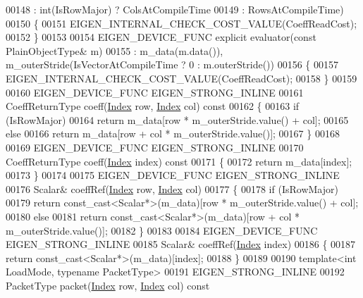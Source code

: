 \begin{DoxyCode}
00148                                            : int(IsRowMajor) ? ColsAtCompileTime 
00149                                            : RowsAtCompileTime)
00150   \{
00151     EIGEN\_INTERNAL\_CHECK\_COST\_VALUE(CoeffReadCost);
00152   \}
00153   
00154   EIGEN\_DEVICE\_FUNC \textcolor{keyword}{explicit} evaluator(\textcolor{keyword}{const} PlainObjectType& m)
00155     : m\_data(m.data()), m\_outerStride(IsVectorAtCompileTime ? 0 : m.outerStride()) 
00156   \{
00157     EIGEN\_INTERNAL\_CHECK\_COST\_VALUE(CoeffReadCost);
00158   \}
00159 
00160   EIGEN\_DEVICE\_FUNC EIGEN\_STRONG\_INLINE
00161   CoeffReturnType coeff(\hyperlink{namespace_eigen_a62e77e0933482dafde8fe197d9a2cfde}{Index} row, \hyperlink{namespace_eigen_a62e77e0933482dafde8fe197d9a2cfde}{Index} col)\textcolor{keyword}{ const}
00162 \textcolor{keyword}{  }\{
00163     \textcolor{keywordflow}{if} (IsRowMajor)
00164       \textcolor{keywordflow}{return} m\_data[row * m\_outerStride.value() + col];
00165     \textcolor{keywordflow}{else}
00166       \textcolor{keywordflow}{return} m\_data[row + col * m\_outerStride.value()];
00167   \}
00168 
00169   EIGEN\_DEVICE\_FUNC EIGEN\_STRONG\_INLINE
00170   CoeffReturnType coeff(\hyperlink{namespace_eigen_a62e77e0933482dafde8fe197d9a2cfde}{Index} index)\textcolor{keyword}{ const}
00171 \textcolor{keyword}{  }\{
00172     \textcolor{keywordflow}{return} m\_data[index];
00173   \}
00174 
00175   EIGEN\_DEVICE\_FUNC EIGEN\_STRONG\_INLINE
00176   Scalar& coeffRef(\hyperlink{namespace_eigen_a62e77e0933482dafde8fe197d9a2cfde}{Index} row, \hyperlink{namespace_eigen_a62e77e0933482dafde8fe197d9a2cfde}{Index} col)
00177   \{
00178     \textcolor{keywordflow}{if} (IsRowMajor)
00179       \textcolor{keywordflow}{return} \textcolor{keyword}{const\_cast<}Scalar*\textcolor{keyword}{>}(m\_data)[row * m\_outerStride.value() + col];
00180     \textcolor{keywordflow}{else}
00181       \textcolor{keywordflow}{return} \textcolor{keyword}{const\_cast<}Scalar*\textcolor{keyword}{>}(m\_data)[row + col * m\_outerStride.value()];
00182   \}
00183 
00184   EIGEN\_DEVICE\_FUNC EIGEN\_STRONG\_INLINE
00185   Scalar& coeffRef(\hyperlink{namespace_eigen_a62e77e0933482dafde8fe197d9a2cfde}{Index} index)
00186   \{
00187     \textcolor{keywordflow}{return} \textcolor{keyword}{const\_cast<}Scalar*\textcolor{keyword}{>}(m\_data)[index];
00188   \}
00189 
00190   \textcolor{keyword}{template}<\textcolor{keywordtype}{int} LoadMode, \textcolor{keyword}{typename} PacketType>
00191   EIGEN\_STRONG\_INLINE
00192   PacketType packet(\hyperlink{namespace_eigen_a62e77e0933482dafde8fe197d9a2cfde}{Index} row, \hyperlink{namespace_eigen_a62e77e0933482dafde8fe197d9a2cfde}{Index} col)\textcolor{keyword}{ const}

\end{DoxyCode}
